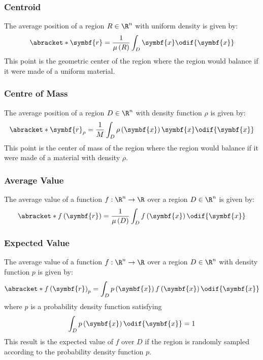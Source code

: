\documentclass{article}
\begin{document}
\subsubsection*{Centroid}
The average position of a region \(R \in \R^n\) with uniform density is
given by:
\begin{equation*}
    \abracket*{\symbf{r}} = \frac{1}{\mu\left( R \right)} \int_D \symbf{x} \odif{\symbf{x}}
\end{equation*}
This point is the geometric center of the region where the region would
balance if it were made of a uniform material.
\subsubsection*{Centre of Mass}
The average position of a region \(D \in \R^n\) with density function
\(\rho\) is given by:
\begin{equation*}
    \abracket*{\symbf{r}}_\rho = \frac{1}{M} \int_D \rho\left( \symbf{x} \right) \symbf{x} \odif{\symbf{x}}
\end{equation*}
This point is the center of mass of the region where the region would
balance if it were made of a material with density \(\rho\).
\subsubsection*{Average Value}
The average value of a function \(f : \R^n \to \R\) over a region \(D
\in \R^n\) is given by:
\begin{equation*}
    \abracket*{f\left( \symbf{r} \right)} = \frac{1}{\mu\left( D \right)} \int_D f\left( \symbf{x} \right) \odif{\symbf{x}}
\end{equation*}
\subsubsection*{Expected Value}
The average value of a function \(f : \R^n \to \R\) over a region \(D
\in \R^n\) with density function \(p\) is given by:
\begin{equation*}
    \abracket*{f\left( \symbf{r} \right)}_p = \int_D p\left( \symbf{x} \right) f\left( \symbf{x} \right) \odif{\symbf{x}}
\end{equation*}
where \(p\) is a probability density function satisfying
\begin{equation*}
    \int_D p\left( \symbf{x} \right) \odif{\symbf{x}} = 1
\end{equation*}
This result is the expected value of \(f\) over \(D\) if the region
is randomly sampled according to the probability density function \(p\).
\end{document}
